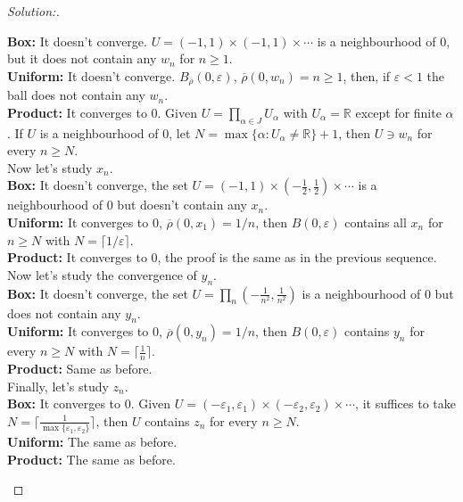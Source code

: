 \documentclass[a4paper,12pt, reqno]{article}
\theoremstyle{definition}
\newenvironment{solution}{\begin{proof}[Solution:]}{\end{proof}}
\newcommand{\R}{\mathbb{R}}
\begin{document}
\begin{solution}
\begin{enumerate}[label=(\alph*)]
          \textbf{Box:} It doesn't converge. $U = (-1,1)\times(-1,1)\times\cdots$ is a neighbourhood of $0$, but it does not contain any $w_{n}$ for $n\geq 1$.\\
          \textbf{Uniform:} It doesn't converge. $B_{\overline{\rho}}(0,\varepsilon)$, $\overline{\rho}(0,w_{n})=n\geq1$, then, if $\varepsilon<1$ the ball does not contain any $w_{n}$.\\
          \textbf{Product:} It converges to $0$. Given $U = \prod_{\alpha\in J}U_{\alpha}$ with $U_{\alpha} = \R$ except for finite $\alpha$. If $U$ is a neighbourhood of $0$, let $N = \max\{ \alpha: U_{\alpha}\neq\R  \}+1$, then $U\ni w_{n}$ for every $n\geq N$.\\

          Now let's study $x_{n}$.\\

          \textbf{Box:} It doesn't converge, the set $U = (-1,1)\times(-\frac{1}{2},\frac{1}{2})\times\cdots$ is a neighbourhood of $0$ but doesn't contain any $x_{n}$.\\
          \textbf{Uniform:} It converges to $0$, $\overline{\rho}(0,x_{1}) = 1/n$, then $B(0,\varepsilon)$ contains all $x_{n}$ for $n\geq N$ with $N = \lceil1/\varepsilon\rceil$.\\
          \textbf{Product:} It converges to $0$, the proof is the same as in the previous sequence.\\

          Now let's study the convergence of $y_{n}$.\\

          \textbf{Box:} It doesn't converge, the set $U = \prod_{n}(-\frac{1}{n^2},\frac{1}{n^2})$ is a neighbourhood of $0$ but does not contain any $y_{n}$.\\
          \textbf{Uniform:} It converges to $0$, $\overline{\rho}(0,y_{n}) =1/n$, then $B(0,\varepsilon)$ contains $y_{n}$ for every $n\geq N$ with $N = \lceil \frac{1}{n}\rceil$.\\
          \textbf{Product:} Same as before.\\

          Finally, let's study $z_{n}$.\\

          \textbf{Box:} It converges to $0$. Given $U = (-\varepsilon_{1},\varepsilon_{1})\times(-\varepsilon_{2},\varepsilon_{2})\times \cdots$, it suffices to take $N = \lceil \frac{1}{\max\{ \varepsilon_{1},\varepsilon_{2} \}}\rceil$, then $U$ contains $z_{n}$ for every $n\geq N$.\\
          \textbf{Uniform:} The same as before.\\
          \textbf{Product:} The same as before.
  \end{enumerate}
\end{solution}
\end{document}
